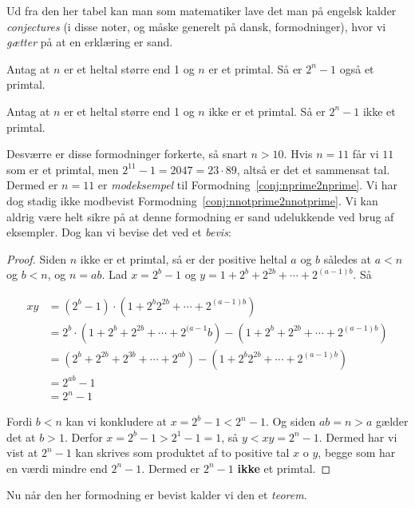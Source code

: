 Ud fra den her tabel kan man som matematiker lave det man på engelsk kalder \textit{conjectures} (i disse noter, og måske generelt på dansk, formodninger), hvor vi \textit{gætter} på at en erklæring er sand.

\begin{conjecture}
  \label{conj:nprime2nprime}
Antag at $n$ er et heltal større end 1 og $n$ er et primtal. Så er $2^{n}-1$ også et primtal.
\end{conjecture}
\begin{conjecture}
  \label{conj:nnotprime2nnotprime}
Antag at $n$ er et heltal større end 1 og $n$ ikke er et primtal. Så er $2^{n}-1$ ikke et primtal.
\end{conjecture}

Desværre er disse formodninger forkerte, så snart $n > 10$. Hvis $n = 11$ får vi $11$ som er et primtal, men $2^{11}-1 = 2047 =  23 \cdot 89$, altså er det et sammensat tal. Dermed er $n = 11$ er \textit{modeksempel} til Formodning~\ref{conj:nprime2nprime}. Vi har dog stadig ikke modbevist Formodning~\ref{conj:nnotprime2nnotprime}. Vi kan aldrig være helt sikre på at denne formodning er sand udelukkende ved brug af eksempler. Dog kan vi bevise det ved et \textit{bevis}:
\begin{proof}
  Siden $n$ ikke er et primtal, så er der positive heltal $a$ og $b$ således at $a < n$ og $b < n$, og $n = ab$. Lad $x = 2^{b}-1$ og $y = 1+2^{b}+2^{2b} + \cdots + 2^{(a-1)b}$. Så

  \begin{align*}
    xy &= (2^{b}-1) \cdot (1+2^{b}2^{2b}+ \cdots + 2^{(a-1)b})\\
       &= 2^{b} \cdot (1 + 2^{b} + 2^{2b} + \cdots + 2^{(a-1}b) - (1+2^{b}+2^{2b}+ \cdots + 2^{(a-1)b})\\
       &= (2^{b}+ 2^{2b}+ 2^{3b}+ \cdots + 2^{ab}) - (1+2^{b}2^{2b}+ \cdots + 2^{(a-1)b})\\
       &= 2^{ab}-1\\
    &= 2^{n}-1
  \end{align*}

  Fordi $b < n$ kan vi konkludere at $x = 2^{b}-1 < 2^{n}-1$. Og siden $ab = n > a$ gælder det at $b > 1$. Derfor $x = 2^{b}-1>2^{1}-1=1$, så $y < xy = 2^{n}-1$. Dermed har vi vist at $2^{n}-1$ kan skrives som produktet af to positive tal $x$ o $y$, begge som har en værdi mindre end $2^{n}-1$. Dermed er $2^{n}-1$ \textbf{ikke} et primtal.
\end{proof}

Nu når den her formodning er bevist kalder vi den et \textit{teorem}.

